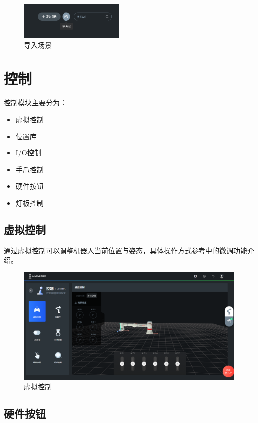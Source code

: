 \begin{figure}[htb!]
	\centering
	\includegraphics[height=1.8cm]{screen/3-20.png}
	\caption{导入场景}
	\label{fig:导入场景}
\end{figure}

\clearpage

\section{控制}
控制模块主要分为：
\begin{itemize}
\item 虚拟控制
\item 位置库
\item I/O控制
\item 手爪控制
\item 硬件按钮
\item 灯板控制
\end{itemize}

\subsection{虚拟控制}
通过虚拟控制可以调整机器人当前位置与姿态，具体操作方式参考中的微调功能介绍。

\begin{figure}[ht]
	\centering
	\includegraphics[width=\textwidth]{screen/3-21.png}
	\caption{虚拟控制}
	\label{fig:虚拟控制示意图}
\end{figure}

\subsection{硬件按钮}

